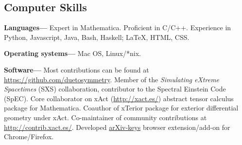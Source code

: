 \documentclass[margin,line]{res}
\begin{document}
\begin{resume}
\section{\sc Computer Skills}
{\bf Languages---}%
Expert in {\sc Mathematica}. Proficient in C/C++. Experience in
Python, Javascript, Java, Bash, Haskell; LaTeX, HTML, CSS.

{\bf Operating systems---}%
Mac OS, Linux/*nix.

{\bf Software---}%
Most contributions can be found at \url{https://github.com/duetosymmetry}.
Member of the {\it Simulating eXtreme Spacetimes} (SXS) collaboration,
contributor to the Spectral Einstein Code (SpEC).
Core collaborator on {\sc xAct} (\url{http://xact.es/}) abstract
tensor calculus package for {\sc  Mathematica}. Coauthor
of {\sc xTerior} package for exterior differential geometry under
{\sc xAct}. Co-maintainer of community contributions at
\url{http://contrib.xact.es/}. Developed
\href{https://chrome.google.com/webstore/detail/arxiv-keys/fkjjdlbhliopfhgddlpoggpmpgjfaojd}{arXiv-keys}
browser extension/add-on for Chrome/Firefox.


\ifx\nopubs\undefined

\else
%
\fi





\end{resume}
\end{document}
